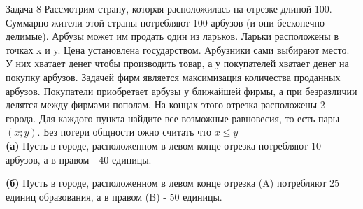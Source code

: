 \begin{mybox}{Задача 8}
    \indent\setlength{\parindent}{1em}\indent\setlength{\parindent}{1em}Рассмотрим страну, которая расположилась на
    отрезке длиной 100. Суммарно жители этой страны потребляют 100 арбузов (и они бесконечно делимые).
    Арбузы может им продать один из ларьков. Ларьки расположены в точках x и y. Цена установлена государством.
    Арбузники сами выбирают место. У них хватает денег чтобы производить товар, а у покупателей хватает денег на покупку
    арбузов. Задачей фирм является максимизация количества проданных арбузов. Покупатели приобретает арбузы у ближайшей
    фирмы, а при безразличии делятся между фирмами пополам. На концах этого отрезка расположены 2 города. Для каждого
    пункта найдите все возможные равновесия, то есть пары $(x;y)$. Без потери общности ожно считать что $x\leq y$\\
    \indent\setlength{\parindent}{1em}\textbf{(а)} Пусть в городе, расположенном в левом конце отрезка потребляют 10
    арбузов,
    а в правом - 40 единицы.
    \begin{center}
    \end{center}
    \indent\setlength{\parindent}{1em}\textbf{(б)} Пусть в городе, расположенном в левом конце отрезка (A) потребляют
    25
    единиц
    образования, а в правом (B) - 50 единицы.
    \begin{center}
\end{center}
\end{mybox}
